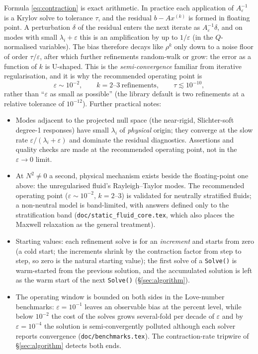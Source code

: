 \documentclass[11pt]{article}
\newcommand{\eps}{\varepsilon}
\begin{document}
Formula \eqref{eq:contraction} is exact arithmetic. In practice each
application of $A_{\eps}^{-1}$ is a Krylov solve to tolerance $\tau$,
and the residual $b - A x^{(k)}$ is formed in floating point. A
perturbation $\delta$ of the residual enters the next iterate as
$A_{\eps}^{-1}\delta$, and on modes with small $\lambda_{i} + \eps$
this is an amplification by up to $1/\eps$ (in the $Q$-normalised
variables). The bias therefore decays like $\rho^{k}$ only down to a
noise floor of order $\tau/\eps$, after which further refinements
random-walk or grow: the error as a function of $k$ is U-shaped. This
is the \emph{semi-convergence} familiar from iterative regularisation,
and it is why the recommended operating point is
\begin{equation}
  \eps \sim 10^{-2}, \qquad k = 2\text{--}3 \ \text{refinements},
  \qquad \tau \lesssim 10^{-10} ,
\end{equation}
rather than ``$\eps$ as small as possible'' (the library default is
two refinements at a relative tolerance of $10^{-12}$). Further
practical notes:
\begin{itemize}
\item Modes adjacent to the projected null space (the near-rigid,
  Slichter-soft degree-1 responses) have small $\lambda_{i}$ of
  \emph{physical} origin; they converge at the slow rate
  $\eps/(\lambda_{i}+\eps)$ and dominate the residual diagnostics.
  Assertions and quality checks are made at the recommended operating
  point, not in the $\eps \to 0$ limit.
\item At $N^2 \neq 0$ a second, physical mechanism exists beside the
  floating-point one above: the unregularised fluid's Rayleigh--Taylor
  modes. The recommended operating point ($\eps \sim 10^{-2}$,
  $k = 2$--$3$) is validated for neutrally stratified fluids; a
  non-neutral model is band-limited, with answers defined only to the
  stratification band (\texttt{doc/static\_fluid\_core.tex}, which
  also places the Maxwell relaxation as the general treatment).
\item Starting values: each refinement solve is for an
  \emph{increment} and starts from zero (a cold start; the increments
  shrink by the contraction factor from step to step, so zero is the
  natural starting value); the first solve of a
  \texttt{Solve()} is warm-started from the previous solution, and the
  accumulated solution is left as the warm start of the next
  \texttt{Solve()} (\S\ref{sec:algorithm}).
\item The operating window is bounded on both sides in the
  Love-number benchmarks: $\eps = 10^{-1}$ leaves an observable bias at
  the percent level, while below $10^{-2}$ the cost of the solves grows
  several-fold per decade of $\eps$ and by $\eps = 10^{-4}$ the solution
  is semi-convergently polluted although each solver reports
  convergence (\texttt{doc/benchmarks.tex}). The contraction-rate
  tripwire of \S\ref{sec:algorithm} detects both ends.
\end{itemize}
\end{document}
